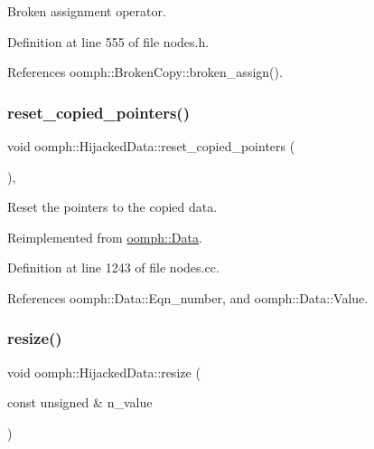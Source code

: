 Broken assignment operator. 



Definition at line 555 of file nodes.\+h.



References oomph\+::\+Broken\+Copy\+::broken\+\_\+assign().

\mbox{\label{classoomph_1_1HijackedData_ae8253ed64e04771ea3d45c3d84d614d7}} 
\subsubsection{\texorpdfstring{reset\+\_\+copied\+\_\+pointers()}{reset\_copied\_pointers()}}
{\footnotesize\ttfamily void oomph\+::\+Hijacked\+Data\+::reset\+\_\+copied\+\_\+pointers (\begin{DoxyParamCaption}{ }\end{DoxyParamCaption})\hspace{0.3cm}{\ttfamily [private]}, {\ttfamily [virtual]}}



Reset the pointers to the copied data. 



Reimplemented from \hyperlink{classoomph_1_1Data_afd33533f3ddf61bc34106a4dc72de541}{oomph\+::\+Data}.



Definition at line 1243 of file nodes.\+cc.



References oomph\+::\+Data\+::\+Eqn\+\_\+number, and oomph\+::\+Data\+::\+Value.

\mbox{\label{classoomph_1_1HijackedData_ae2ae3e860b36b40c133d56aae5fc39a3}} 
\subsubsection{\texorpdfstring{resize()}{resize()}}
{\footnotesize\ttfamily void oomph\+::\+Hijacked\+Data\+::resize (\begin{DoxyParamCaption}\item[{const unsigned \&}]{n\+\_\+value }\end{DoxyParamCaption})\hspace{0.3cm}{\ttfamily [virtual]}}



